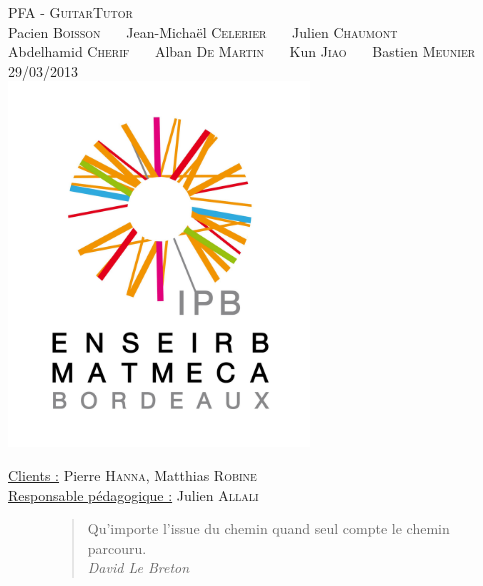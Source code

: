 \documentclass[a4paper,11pt]{article}
\begin{document}
\begin{titlepage}
  \begin{center}

    \textsc{\LARGE PFA - GuitarTutor}\\[2cm]
    Pacien \textsc{Boisson} \ \ \ Jean-Michaël \textsc{Celerier}  \ \ \ Julien \textsc{Chaumont}\\
    Abdelhamid \textsc{Cherif} \ \ \ Alban \textsc{De Martin} \ \ \ Kun \textsc{Jiao} \ \ \ Bastien \textsc{Meunier} \\[3cm]
    \textsc{\large 29/03/2013 }\\[1.5cm]
    \includegraphics[width=8cm]{logo.png}

  \end{center}
  \vspace{3cm}
  \begin{flushleft}
   \underline{Clients :} Pierre \textsc{Hanna}, Matthias \textsc{Robine}\\
   \underline{Responsable pédagogique :} Julien \textsc{Allali}
  \end{flushleft}


\end{titlepage}

\begin{figure}[p]
  \centering
  \begin{quotation}
Qu’importe l’issue du chemin quand seul compte le chemin parcouru.\\
\hfill \em David Le Breton
\end{quotation}
\end{figure}






\tableofcontents








\end{document}
